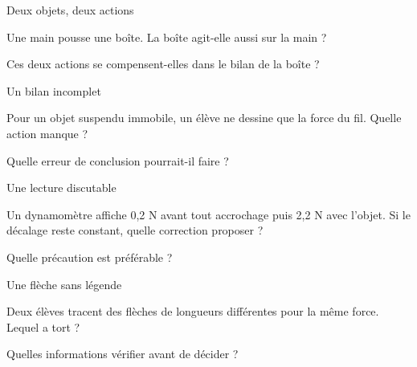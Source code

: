 \clearpage{}
\par\noindent\begin{minipage}{\linewidth}
\begin{exercice}[3]{Deux objets, deux actions}
\begin{questions}
\item Une main pousse une boîte. La boîte agit-elle aussi sur la main ?
\item Ces deux actions se compensent-elles dans le bilan de la boîte ?
\end{questions}
\end{exercice}
\end{minipage}
\par\noindent\begin{minipage}{\linewidth}
\begin{exercice}[3]{Un bilan incomplet}
\begin{questions}
\item Pour un objet suspendu immobile, un élève ne dessine que la force du fil. Quelle action manque ?
\item Quelle erreur de conclusion pourrait-il faire ?
\end{questions}
\end{exercice}
\end{minipage}
\par\noindent\begin{minipage}{\linewidth}
\begin{exercice}[3]{Une lecture discutable}
\begin{questions}
\item Un dynamomètre affiche 0,2 N avant tout accrochage puis 2,2 N avec l’objet. Si le décalage reste constant, quelle correction proposer ?
\item Quelle précaution est préférable ?
\end{questions}
\end{exercice}
\end{minipage}
\par\noindent\begin{minipage}{\linewidth}
\begin{exercice}[3]{Une flèche sans légende}
\begin{questions}
\item Deux élèves tracent des flèches de longueurs différentes pour la même force. Lequel a tort ?
\item Quelles informations vérifier avant de décider ?
\end{questions}
\end{exercice}
\end{minipage}
